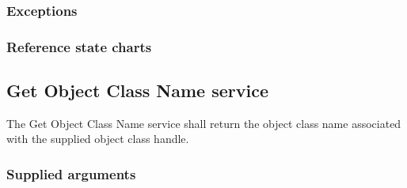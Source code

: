 \begin{compactstdpage}
    \subsubsection{Exceptions}


    \subsubsection{Reference state charts}


    \subsection{Get Object Class Name service}

    The Get Object Class Name service shall return the object class name associated with the supplied object class handle.

    \subsubsection{Supplied arguments}

\end{compactstdpage}

\clearpage

